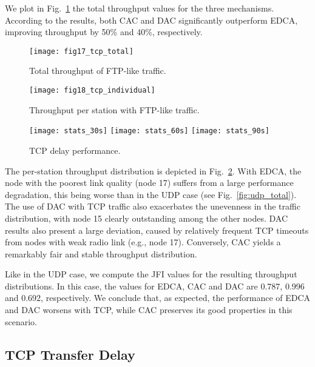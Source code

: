 \documentclass[a4paper,10pt]{article}
\begin{document}
We plot in Fig.~\ref{fig:tcp_total} the total throughput values for the three mechanisms. According to the results, both CAC and DAC significantly outperform EDCA, improving throughput by 50\% and 40\%, respectively.

\begin{figure}[!t]\texttt{[image: fig17\_tcp\_total]}\caption{Total throughput of FTP-like traffic. }\label{fig:tcp_total}\end{figure}

\begin{figure}[t]\texttt{[image: fig18\_tcp\_individual]}\caption{Throughput per station with FTP-like traffic.}\label{fig:tcp_individual}\end{figure}

\begin{figure}[p]
\centering
\texttt{[image: stats\_30s]}
\texttt{[image: stats\_60s]}
\texttt{[image: stats\_90s]}
\caption{TCP delay performance.}\label{fig:delay_individual}\end{figure}

The per-station throughput distribution is depicted in Fig.~\ref{fig:tcp_individual}. With EDCA, the node with the poorest link quality (node 17) suffers from a large performance degradation, this being worse than in the UDP case (see Fig.~\ref{fig:udp_total}). The use of DAC with TCP traffic also exacerbates the unevenness in the traffic distribution, with node 15 clearly outstanding among the other nodes. DAC results also present a large deviation, caused by relatively frequent TCP timeouts from nodes with weak radio link (e.g., node 17). Conversely, CAC yields a remarkably fair and stable throughput distribution. 



Like in the UDP case, we compute the JFI values for the resulting throughput distributions. In this case, the values for EDCA, CAC and DAC are 0.787, 0.996 and 0.692, respectively. We conclude that, as expected, the performance of EDCA and DAC worsens with TCP, while CAC preserves its good properties in this scenario.

\vspace{0.5em}
\subsection{TCP Transfer Delay}
\end{document}
